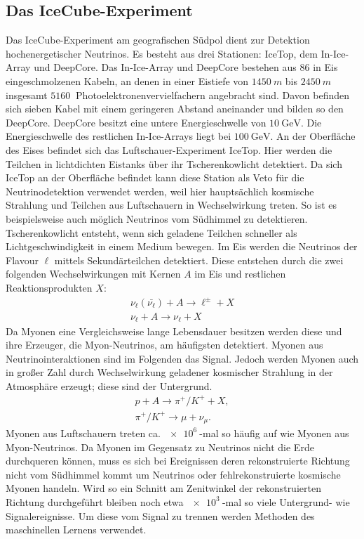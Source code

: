 \subsection{Das IceCube-Experiment}
\label{sec:eiswürfel}
Das IceCube-Experiment am geografischen Südpol dient zur Detektion hochenergetischer Neutrinos.
Es besteht aus drei Stationen: IceTop, dem In-Ice-Array und DeepCore.
Das In-Ice-Array und DeepCore bestehen aus 86 in Eis eingeschmolzenen Kabeln, an denen in einer Eistiefe von $\SI{1450}{m}$ bis $\SI{2450}{m}$ insgesamt $\SI{5160}{}$ Photoelektronenvervielfachern angebracht sind.
Davon befinden sich sieben Kabel mit einem geringeren Abstand aneinander und bilden so den DeepCore.
DeepCore besitzt eine untere Energieschwelle von $\SI{10}{\giga\electronvolt}$.
Die Energieschwelle des restlichen In-Ice-Arrays liegt bei $\SI{100}{\giga\electronvolt}$.
An der Oberfläche des Eises befindet sich das Luftschauer-Experiment IceTop.
Hier werden die Teilchen in lichtdichten Eistanks über ihr Tscherenkowlicht detektiert.
Da sich IceTop an der Oberfläche befindet kann diese Station als Veto für die Neutrinodetektion verwendet werden, weil hier hauptsächlich kosmische Strahlung und Teilchen aus Luftschauern in Wechselwirkung treten.
So ist es beispielsweise auch möglich Neutrinos vom Südhimmel zu detektieren.
Tscherenkowlicht entsteht, wenn sich geladene Teilchen schneller als Lichtgeschwindigkeit in einem Medium bewegen.
Im Eis werden die Neutrinos der Flavour $\ell$ mittels Sekundärteilchen detektiert.
Diese entstehen durch die zwei folgenden Wechselwirkungen mit Kernen $A$ im Eis und restlichen Reaktionsprodukten $X$:
\begin{align*}
	\nu_\ell(\bar{\nu_\ell}) + A \rightarrow \ell^{\pm} + X \\
	\nu_\ell + A \rightarrow \nu_\ell + X
\end{align*}
Da Myonen eine Vergleichsweise lange Lebensdauer besitzen werden diese und ihre Erzeuger, die Myon-Neutrinos, am häufigsten detektiert.
Myonen aus Neutrinointeraktionen sind im Folgenden das Signal.
Jedoch werden Myonen auch in großer Zahl durch Wechselwirkung geladener kosmischer Strahlung in der Atmosphäre erzeugt; diese sind der Untergrund.
\begin{align*}
	p + A \rightarrow \pi^+/K^+ + X, \\
	\pi^+/K^+\rightarrow \mu + \nu_{\mu}.
\end{align*}
Myonen aus Luftschauern treten ca. $\SI{e6}{}$-mal so häufig auf wie Myonen aus Myon-Neutrinos.
Da Myonen im Gegensatz zu Neutrinos nicht die Erde durchqueren können, muss es sich bei Ereignissen deren rekonstruierte Richtung nicht vom Südhimmel kommt um Neutrinos oder fehlrekonstruierte kosmische Myonen handeln.
Wird so ein Schnitt am Zenitwinkel der rekonstruierten Richtung durchgeführt bleiben noch etwa $\SI{e3}{}$-mal so viele Untergrund- wie Signalereignisse.
Um diese vom Signal zu trennen werden Methoden des maschinellen Lernens verwendet.

